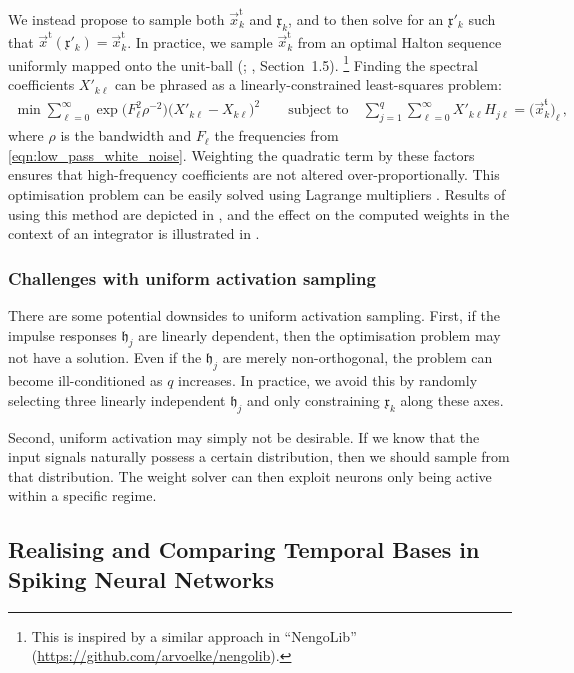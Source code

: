 We instead propose to sample both $\vec{x}_k^\mathrm{t}$ and $\mathfrak{x}_k$, and to then solve for an $\mathfrak{x}'_k$ such that $\vec{x}^\mathrm{t}(\mathfrak{x}'_k) = \vec{x}_k^\mathrm{t}$.
In practice, we sample $\vec{x}_k^\mathrm{t}$ from an optimal Halton sequence uniformly mapped onto the unit-ball (\cite{chi2005optimal}; \cite{fang1994numbertheoretic}, Section~1.5).%
\footnote{This is inspired by a similar approach in \enquote{NengoLib} (\url{https://github.com/arvoelke/nengolib}).}
Finding the spectral coefficients $X'_{k\ell}$ can be phrased as a linearly-constrained least-squares problem:
\begin{align*}
	\min \sum\nolimits_{\ell = 0}^\infty \exp\bigl(F_\ell^2 \rho^{-2}\bigr) \bigl( X'_{k\ell} - X_{k\ell} \bigr)^2 \quad\quad \text{subject to} \quad \sum\nolimits_{j = 1}^q \sum\nolimits_{\ell = 0}^\infty X'_{k\ell} H_{j\ell} = \bigl( \vec{x}_k^\mathfrak{t} \bigr)_\ell \,,
\end{align*}
where $\rho$ is the bandwidth and $F_\ell$ the frequencies from \cref{eqn:low_pass_white_noise}.
Weighting the quadratic term by these factors ensures that high-frequency coefficients are not altered over-proportionally.
This optimisation problem can be easily solved using Lagrange multipliers \citep[cf.][Chapter~5]{boyd2004convex}.
Results of using this method are depicted in , and the effect on the computed weights in the context of an integrator is illustrated in .

\subsubsection{Challenges with uniform activation sampling}
There are some potential downsides to uniform activation sampling.
First, if the impulse responses $\mathfrak{h}_j$ are linearly dependent, then the optimisation problem may not have a solution.
Even if the $\mathfrak{h}_j$ are merely non-orthogonal, the problem can become ill-conditioned as $q$ increases.
In practice, we avoid this by randomly selecting three linearly independent $\mathfrak{h}_j$ and only constraining $\mathfrak{x}_k$ along these axes.

Second, uniform activation may simply not be desirable.
If we know that the input signals naturally possess a certain distribution, then we should sample from that distribution.
The weight solver can then exploit neurons only being active within a specific regime.

\subsection{Realising and Comparing Temporal Bases in Spiking Neural Networks}
\label{sec:spiking_temporal_bases}

